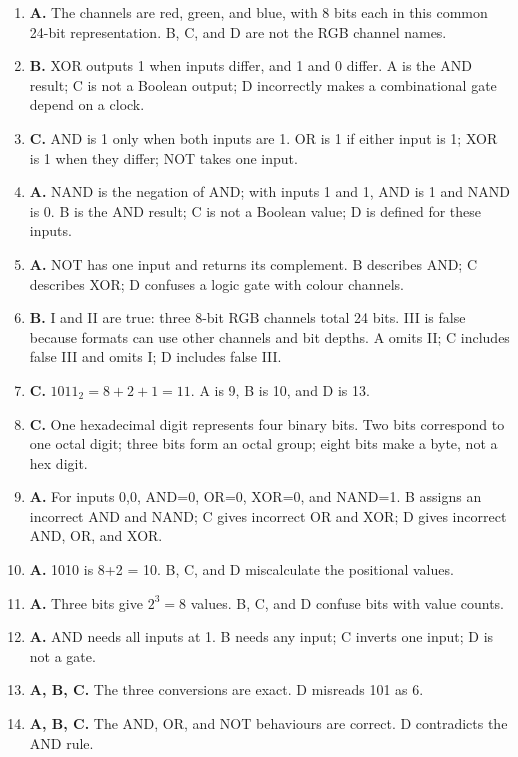 \documentclass[11pt]{article}
\begin{document}
\begin{enumerate}
  conflates UTF-8 and BCD; C confuses Unicode with a four-bit decimal code;
  D falsely claims a fixed eight-byte length.
\item \textbf{A.} The channels are red, green, and blue, with 8 bits each in
  this common 24-bit representation. B, C, and D are not the RGB channel
  names.
\item \textbf{B.} XOR outputs 1 when inputs differ, and 1 and 0 differ. A is
  the AND result; C is not a Boolean output; D incorrectly makes a
  combinational gate depend on a clock.
\item \textbf{C.} AND is 1 only when both inputs are 1. OR is 1 if either
  input is 1; XOR is 1 when they differ; NOT takes one input.
\item \textbf{A.} NAND is the negation of AND; with inputs 1 and 1, AND is 1
  and NAND is 0. B is the AND result; C is not a Boolean value; D is defined
  for these inputs.
\item \textbf{A.} NOT has one input and returns its complement. B describes
  AND; C describes XOR; D confuses a logic gate with colour channels.
\item \textbf{B.} I and II are true: three 8-bit RGB channels total 24 bits.
  III is false because formats can use other channels and bit depths. A
  omits II; C includes false III and omits I; D includes false III.
\item \textbf{C.} $1011_2=8+2+1=11$. A is 9, B is 10, and D is 13.
\item \textbf{C.} One hexadecimal digit represents four binary bits.
  Two bits correspond to one octal digit; three bits form an octal group;
  eight bits make a byte, not a hex digit.
\item \textbf{A.} For inputs 0,0, AND=0, OR=0, XOR=0, and NAND=1. B assigns
  an incorrect AND and NAND; C gives incorrect OR and XOR; D gives
  incorrect AND, OR, and XOR.

\item \textbf{A.} 1010 is 8+2 = 10. B, C, and D miscalculate the positional values.
\item \textbf{A.} Three bits give $2^3 = 8$ values. B, C, and D confuse bits with value counts.
\item \textbf{A.} AND needs all inputs at 1. B needs any input; C inverts one input; D is not a gate.
\item \textbf{A, B, C.} The three conversions are exact. D misreads 101 as 6.
\item \textbf{A, B, C.} The AND, OR, and NOT behaviours are correct. D contradicts the AND rule.
\end{enumerate}
\def\JKSSBLessonID{50}\def\JKSSBAnswers{1}
\end{document}

